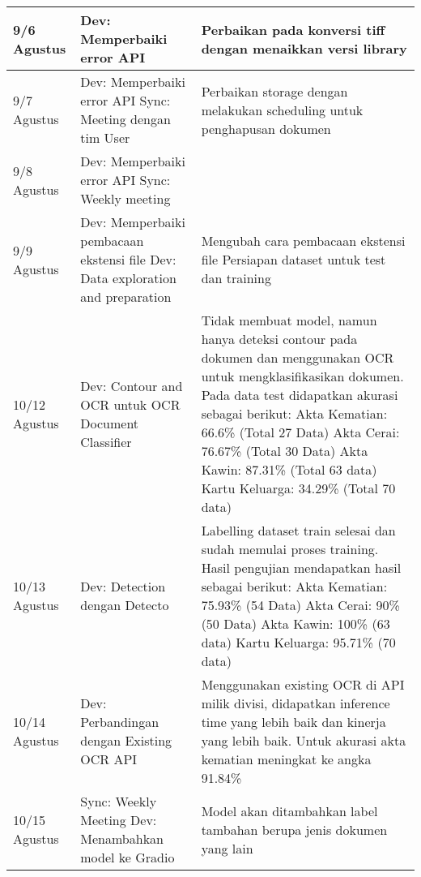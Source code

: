 \begin{longtable}{|p{5em}|p{10em}|p{15em}|}
        9/6 Agustus & Dev: Memperbaiki error API & Perbaikan pada konversi tiff dengan menaikkan versi library \\ \hline
        9/7 Agustus & Dev: Memperbaiki error API \newline
Sync: Meeting dengan tim User & Perbaikan storage dengan melakukan scheduling untuk penghapusan dokumen \\ \hline
        9/8 Agustus & Dev: Memperbaiki error API \newline
Sync: Weekly meeting & ~ \\ \hline
        9/9 Agustus & Dev: Memperbaiki pembacaan ekstensi file \newline
Dev: Data exploration and preparation & Mengubah cara pembacaan ekstensi file \newline
Persiapan dataset untuk test dan training \\ \hline
        10/12 Agustus & Dev: Contour and OCR untuk OCR Document Classifier & Tidak membuat model, namun hanya deteksi contour pada dokumen dan menggunakan OCR untuk mengklasifikasikan dokumen. Pada data test didapatkan akurasi sebagai berikut: \newline
Akta Kematian: 66.6\% (Total 27 Data) \newline
Akta Cerai: 76.67\% (Total 30 Data) \newline
Akta Kawin: 87.31\% (Total 63 data) \newline
Kartu Keluarga: 34.29\% (Total 70 data) \\ \hline
        10/13 Agustus & Dev: Detection dengan Detecto & Labelling dataset train selesai dan sudah memulai proses training. \newline
Hasil pengujian mendapatkan hasil sebagai berikut: \newline
Akta Kematian: 75.93\% (54 Data) \newline
Akta Cerai: 90\%(50 Data) \newline
Akta Kawin: 100\% (63 data) \newline
Kartu Keluarga: 95.71\% (70 data) \\ \hline
        10/14 Agustus & Dev: Perbandingan dengan Existing OCR API & Menggunakan existing OCR di API milik divisi, didapatkan inference time yang lebih baik dan kinerja yang lebih baik. Untuk akurasi akta kematian meningkat ke angka 91.84\% \\ \hline
        10/15 Agustus & Sync: Weekly Meeting \newline
Dev: Menambahkan model ke Gradio & Model akan ditambahkan label tambahan berupa jenis dokumen yang lain \newline

\end{longtable}
